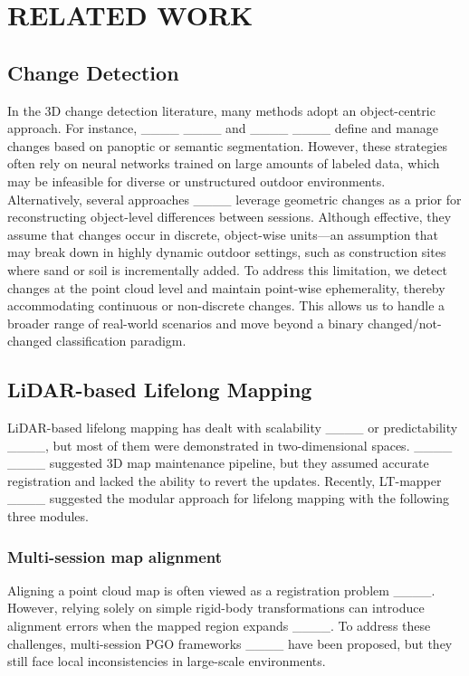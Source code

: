 \section{RELATED WORK}
\label{sec:realtedwork}

\subsection{Change Detection}
In the 3D change detection literature, many methods adopt an object-centric approach. For instance, ____ ____ and ____ ____ define and manage changes based on panoptic or semantic segmentation. However, these strategies often rely on neural networks trained on large amounts of labeled data, which may be infeasible for diverse or unstructured outdoor environments.
Alternatively, several approaches ____ leverage geometric changes as a prior for reconstructing object-level differences between sessions. Although effective, they assume that changes occur in discrete, object-wise units---an assumption that may break down in highly dynamic outdoor settings, such as construction sites where sand or soil is incrementally added. To address this limitation, we detect changes at the point cloud level and maintain point-wise ephemerality, thereby accommodating continuous or non-discrete changes. This allows us to handle a broader range of real-world scenarios and move beyond a binary changed/not-changed classification paradigm.

\subsection{LiDAR-based Lifelong Mapping}
LiDAR-based lifelong mapping has dealt with scalability ____ or predictability ____, but most of them were demonstrated in two-dimensional spaces.
____ ____ suggested 3D map maintenance pipeline, but they assumed accurate registration and lacked the ability to revert the updates.
Recently, LT-mapper ____ suggested the modular approach for lifelong mapping with the following three modules.

\subsubsection{Multi-session map alignment} 
Aligning a point cloud map is often viewed as a registration problem ____. 
However, relying solely on simple rigid-body transformations can introduce alignment errors when the mapped region expands ____.
To address these challenges, multi-session \ac{PGO} frameworks ____ have been proposed, but they still face local inconsistencies in large-scale environments. 

